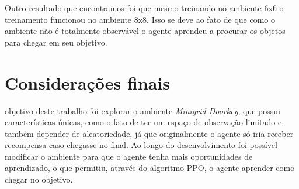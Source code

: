 \documentclass[9pt,a4paper,twoside]{tau}
\begin{document}
Outro resultado que encontramos foi que mesmo treinando no ambiente 6x6 o treinamento funcionou no ambiente 8x8. Isso se deve ao fato de que como o ambiente não é totalmente observável o agente aprendeu a procurar os objetos para chegar em seu objetivo.

\section{Considerações finais}

 objetivo deste trabalho foi explorar o ambiente \textit{Minigrid-Doorkey}, que possui características únicas, como o fato de ter um espaço de observação limitado e também depender de aleatoriedade, já que originalmente o agente só iria receber recompensa caso chegasse no final. Ao longo do desenvolvimento foi possível modificar o ambiente para que o agente tenha mais oportunidades de aprendizado, o que permitiu, através do algoritmo PPO, o agente aprender como chegar no objetivo.
\printbibliography
\end{document}
